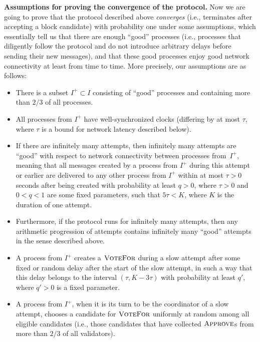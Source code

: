\documentclass[12pt,oneside]{article}
\def\makepoint#1{\medbreak\noindent{\bf #1.\ }}
\def\nxsubpoint{\refstepcounter{subsubsection}%
  \smallbreak\makepoint{\thesubsubsection}}
\def\emb#1{\textbf{#1.}}
\def\opsc#1{\operatorname{\textsc{#1}}}
\def\Approve{\opsc{Approve}}
\def\VoteFor{\opsc{VoteFor}}
\begin{document}
\nxsubpoint\emb{Assumptions for proving the convergence of the protocol}\label{sp:conv.ass}
Now we are going to prove that the protocol described above {\em converges\/} (i.e., terminates after accepting a block candidate) with probability one under some assumptions, which essentially tell us that there are enough ``good'' processes (i.e., processes that diligently follow the protocol and do not introduce arbitrary delays before sending their new messages), and that these good processes enjoy good network connectivity at least from time to time. More precisely, our assumptions are as follows:
\begin{itemize}
\item There is a subset $I^+\subset I$ consisting of ``good'' processes and containing more than $2/3$ of all processes.
\item All processes from $I^+$ have well-synchronized clocks (differing by at most $\tau$, where $\tau$ is a bound for network latency described below).
\item If there are infinitely many attempts, then infinitely many attempts are ``good'' with respect to network connectivity between processes from~$I^+$, meaning that all messages created by a process from $I^+$ during this attempt or earlier are delivered to any other process from $I^+$ within at most $\tau>0$ seconds after being created with probability at least $q>0$, where $\tau>0$ and $0<q<1$ are some fixed parameters, such that $5\tau<K$, where $K$ is the duration of one attempt.
\item Furthermore, if the protocol runs for infinitely many attempts, then any arithmetic progression of attempts contains infinitely many ``good'' attempts in the sense described above.
\item A process from $I^+$ creates a $\VoteFor$ during a slow attempt after some fixed or random delay after the start of the slow attempt, in such a way that this delay belongs to the interval $(\tau,K-3\tau)$ with probability at least $q'$, where $q'>0$ is a fixed parameter.
\item A process from $I^+$, when it is its turn to be the coordinator of a slow attempt, chooses a candidate for $\VoteFor$ uniformly at random among all eligible candidates (i.e., those candidates that have collected $\Approve$s from more than $2/3$ of all validators).
\end{itemize}
\end{document}
